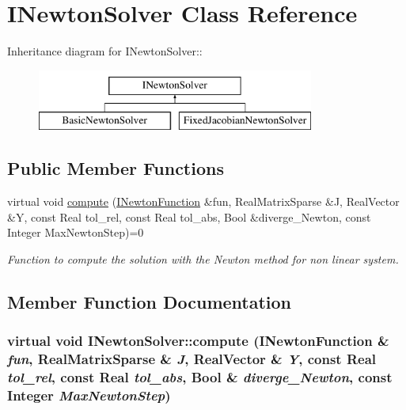\hypertarget{classINewtonSolver}{
\section{INewtonSolver Class Reference}
\label{classINewtonSolver}
}
Inheritance diagram for INewtonSolver::\begin{figure}[H]
\begin{center}
\leavevmode
\includegraphics[height=2cm]{classINewtonSolver}
\end{center}
\end{figure}
\subsection*{Public Member Functions}
\begin{DoxyCompactItemize}
\item 
virtual void \hyperlink{classINewtonSolver_aaf2a0a6fbf03d4f58ba24e47590458d0}{compute} (\hyperlink{classINewtonFunction}{INewtonFunction} \&fun, RealMatrixSparse \&J, RealVector \&Y, const Real tol\_\-rel, const Real tol\_\-abs, Bool \&diverge\_\-Newton, const Integer MaxNewtonStep)=0
\begin{DoxyCompactList}\small\item\em Function to compute the solution with the Newton method for non linear system. \item\end{DoxyCompactList}\end{DoxyCompactItemize}


\subsection{Member Function Documentation}
\hypertarget{classINewtonSolver_aaf2a0a6fbf03d4f58ba24e47590458d0}{
\subsubsection[{compute}]{\setlength{\rightskip}{0pt plus 5cm}virtual void INewtonSolver::compute ({\bf INewtonFunction} \& {\em fun}, \/  RealMatrixSparse \& {\em J}, \/  RealVector \& {\em Y}, \/  const Real {\em tol\_\-rel}, \/  const Real {\em tol\_\-abs}, \/  Bool \& {\em diverge\_\-Newton}, \/  const Integer {\em MaxNewtonStep})}}
\label{classINewtonSolver_aaf2a0a6fbf03d4f58ba24e47590458d0}


